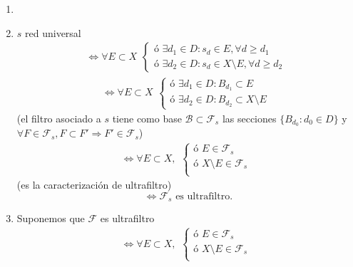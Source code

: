 \begin{dem}
  \begin{enumerate}[label=(\roman*)]
    \item []
    \item $s$ red universal
      \[ 
        \Leftrightarrow \forall E \subset X 
        \begin{aligned}
          \begin{cases}
            \text{ó } \exists d_{1} \in D : s_{d} \in E, \forall d \geq d_{1} \\
            \text{ó } \exists d_{2} \in D : s_{d} \in X \setminus E, \forall d \geq d_{2}
          \end{cases}
        \end{aligned} 
      \] 
      \[ 
        \Leftrightarrow \forall E \subset X 
        \begin{aligned}
          \begin{cases}
            \text{ó } \exists d_{1} \in D : B_{d_{1}} \subset E \\
            \text{ó } \exists d_{2} \in D : B_{d_{2}} \subset X \setminus E
          \end{cases}
        \end{aligned} 
      \] 
      (el filtro asociado a $s$ tiene como base $\mathcal{B} \subset \mathcal{F}_{s}$ las secciones $\{ B_{d_{0}} : d_{0} \in D \}$ y $\forall F \in \mathcal{F}_{s}, F \subset F' \Rightarrow F' \in \mathcal{F}_{s}$)
      \[ 
        \Leftrightarrow \forall E \subset X,
        \begin{aligned}
          \begin{cases}
            \text{ó } E \in \mathcal{F}_{s} \\
            \text{ó } X \setminus E \in \mathcal{F}_{s} \\
          \end{cases}
        \end{aligned} 
      \] 
      (es la caracterización de ultrafiltro)
      \[ 
        \Leftrightarrow \mathcal{F}_{s} \text{ es ultrafiltro}.
      \] 
    \item Suponemos que $\mathcal{F}$ es ultrafiltro
      \[ 
        \Leftrightarrow \forall E \subset X,
        \begin{aligned}
          \begin{cases}
            \text{ó } E \in \mathcal{F}_{s} \\
            \text{ó } X \setminus E \in \mathcal{F}_{s} \\
          \end{cases}

\end{aligned}\]
\end{enumerate}
\end{dem}

